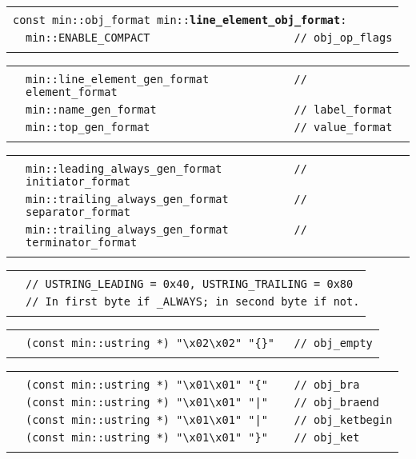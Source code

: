 \documentclass[12pt]{article}
\makeatletter
\newcommand{\TT}[1]{{\tt \bfseries #1}}
\newcommand{\ttindex}[1]{\index{#1@{\tt #1}}}
\newenvironment{indpar}[1][0.3in]%
	{\begin{list}{}%
		     {\setlength{\itemsep}{0in}%
		      \setlength{\topsep}{0in}%
		      \setlength{\parsep}{1ex}%
		      \setlength{\labelwidth}{#1}%
		      \setlength{\leftmargin}{#1}%
		      \addtolength{\leftmargin}{\labelsep}}%
	 \item}%
	{\end{list}}
\newcommand{\LABEL}[1]{\label{#1}}
\newlength{\ARGBREAKLENGTH}
\newcommand{\ARGBREAK}[1][\ARGBREAKLENGTH]{\\&\hspace*{#1}}
\newcommand{\MINKEY}[1]%
	   {\TT{#1}\ttindex{min::#1}\ttindex{#1}}
\makeatother
\begin{document}
\begin{indpar}[1em]
\begin{tabular}{r@{}l}\hspace*{0.1in} \\[-3ex]
\multicolumn{2}{l}{\tt const min::obj\_format
                   min::\MINKEY{line\_element\_obj\_format}:}%
\LABEL{MIN::LINE_ELEMENT_OBJ_FORMAT}\ARGBREAK
\verb|min::ENABLE_COMPACT                      // obj_op_flags|\ARGBREAK
\end{tabular}

\vspace{-4ex}\begin{tabular}{r@{}l}\hspace*{0.1in}\ARGBREAK
\verb|min::line_element_gen_format             // element_format|\ARGBREAK
\verb|min::name_gen_format                     // label_format|\ARGBREAK
\verb|min::top_gen_format                      // value_format|\ARGBREAK
\end{tabular}

\vspace{-4ex}\begin{tabular}{r@{}l}\hspace*{0.1in}\ARGBREAK
\verb|min::leading_always_gen_format           // initiator_format|\ARGBREAK
\verb|min::trailing_always_gen_format          // separator_format|\ARGBREAK
\verb|min::trailing_always_gen_format          // terminator_format|\ARGBREAK
\end{tabular}

\vspace{-4ex}\begin{tabular}{r@{}l}\hspace*{0.1in}\ARGBREAK
\verb|// USTRING_LEADING = 0x40, USTRING_TRAILING = 0x80|\ARGBREAK
\verb|// In first byte if _ALWAYS; in second byte if not.|\ARGBREAK
\end{tabular}

\vspace{-4ex}\begin{tabular}{r@{}l}\hspace*{0.1in}\ARGBREAK
\verb|(const min::ustring *) "\x02\x02" "{}"   // obj_empty|\ARGBREAK
\end{tabular}

\vspace{-4ex}\begin{tabular}{r@{}l}\hspace*{0.1in}\ARGBREAK
\verb|(const min::ustring *) "\x01\x01" "{"    // obj_bra|\ARGBREAK
\verb$(const min::ustring *) "\x01\x01" "|"    // obj_braend$\ARGBREAK
\verb$(const min::ustring *) "\x01\x01" "|"    // obj_ketbegin$\ARGBREAK
\verb|(const min::ustring *) "\x01\x01" "}"    // obj_ket|\ARGBREAK
\end{tabular}


\end{indpar}
\end{document}
